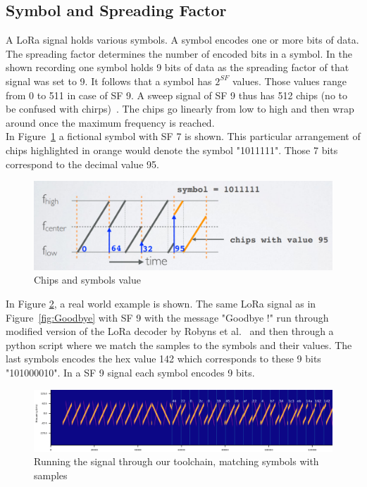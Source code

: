 \subsection{Symbol and Spreading Factor}
A LoRa signal holds various symbols. A symbol encodes one or more bits of data.
The spreading factor determines the number of encoded bits in a symbol.
In the shown recording one symbol holds 9 bits of data as the spreading factor of that signal was set to 9.
It follows that a symbol has $2^{SF}$ values. Those values range from 0 to 511 in case of SF 9. A sweep signal of SF 9
thus has 512 chips (no to be confused with chirps)~\cite{lora_symbol_mobilefish}.
The chips go linearly from low to high and then wrap around once the maximum frequency is reached.
\\
In Figure~\ref{fig:fict_symbols} a fictional symbol with SF 7 is shown. This particular 
arrangement of chips highlighted in orange would denote the symbol "1011111". Those 7 bits correspond 
to the decimal value 95.
\begin{figure}[h]
    \centering
    \includegraphics[width=1\textwidth]{figures/chips_and_symbols.png}
    \caption{Chips and symbols value~\cite{lora_symbol_mobilefish}}
    \label{fig:fict_symbols}
\end{figure}

In Figure \ref{fig:Goodbye_decoded}, a real world example is shown. The same LoRa signal as in Figure~\ref{fig:Goodbye} with SF 9 with the message "Goodbye !"
run through modified version of the LoRa decoder by Robyns et al.~\cite{robyns} and then through a python script where we match the samples to the symbols and their 
values. The last symbols encodes the hex value 142 which corresponds to these 9 bits "101000010". In a SF 9 signal each symbol encodes 9 bits.
\begin{figure}[h]
    \centering
    \includegraphics[width=1\textwidth]{figures/Goodbye_decoded.png}
    \caption{Running the signal through our toolchain, matching symbols with samples}
    \label{fig:Goodbye_decoded}
\end{figure}

